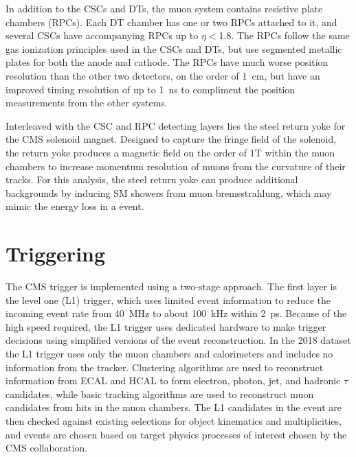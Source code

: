 In addition to the CSCs and DTs, the muon system contains resistive plate chambers (RPCs). 
Each DT chamber has one or two RPCs attached to it, and several CSCs have accompanying RPCs up to $\eta<$1.8. 
The RPCs follow the same gas ionization principles used in the CSCs and DTs, but use segmented metallic plates for both the anode and cathode.
The RPCs have much worse position resolution than the other two detectors, on the order of \SI{1}{\centi\meter}, but have an improved timing resolution of up to \SI{1}{\nano\second} to compliment the position measurements from the other systems.

Interleaved with the CSC and RPC detecting layers lies the steel return yoke for the CMS solenoid magnet.
Designed to capture the fringe field of the solenoid, the return yoke produces a magnetic field on the order of 1T within the muon chambers to increase momentum resolution of muons from the curvature of their tracks.
For this analysis, the steel return yoke can produce additional backgrounds by inducing SM showers from muon bremsstrahlung, which may mimic the energy loss in a \dbrem event.

\section{Triggering}
The CMS trigger is implemented using a two-stage approach. The first layer is the level one (L1) trigger, which uses limited event information to reduce the incoming event rate from \SI{40}{\mega\hertz} to about \SI{100}{\kilo\hertz} within \SI{2}{\pico\second}. 
Because of the high speed required, the L1 trigger uses dedicated hardware to make trigger decisions using simplified versions of the event reconstruction.
In the 2018 dataset the L1 trigger uses only the muon chambers and calorimeters and includes no information from the tracker.
Clustering algorithms are used to reconstruct information from ECAL and HCAL to form electron, photon, jet, and hadronic $\tau$ candidates, while basic tracking algorithms are used to reconstruct muon candidates from hits in the muon chambers.
The L1 candidates in the event are then checked against existing selections for object kinematics and multiplicities, and events are chosen based on target physics processes of interest chosen by the CMS collaboration.

